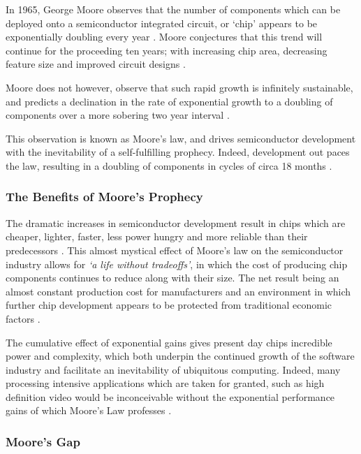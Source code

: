 \documentclass[12pt,a4paper]{article}
\begin{document}
In 1965, George Moore observes that the number of components which can be deployed onto a semiconductor integrated circuit, or `chip' appears to be exponentially doubling every year \cite{fiftyYearsOfMoores}. Moore conjectures that this trend will continue for the proceeding ten years; with increasing chip area, decreasing feature size and improved circuit designs \cite{endOfSemiconductors}.

Moore does not however, observe that such rapid growth is infinitely sustainable, and predicts a declination in the rate of exponential growth to a doubling of components over a more sobering two year interval \cite{fiftyYearsOfMoores}.

This observation is known as Moore's law, and drives semiconductor development with the inevitability of a self-fulfilling prophecy. Indeed, development out paces the law, resulting in a doubling of components in cycles of circa 18 months \cite{fiftyYearsOfMoores}.

\subsubsection{The Benefits of Moore's Prophecy} 

The dramatic increases in semiconductor development result in chips which are cheaper, lighter, faster, less power hungry and more reliable than their predecessors \cite{fiftyYearsOfMoores}. This almost mystical effect of Moore's law on the semiconductor industry allows for \cite{fiftyYearsOfMoores}  \textit{`a life without tradeoffs'}, in which the cost of producing chip components continues to reduce along with their size. The net result being an almost constant production cost for manufacturers and an environment in which further chip development appears to be protected from traditional economic factors \cite{fiftyYearsOfMoores}.

The cumulative effect of exponential gains gives present day chips incredible power and complexity, which both underpin the continued growth of the software industry and facilitate an inevitability of ubiquitous computing. Indeed, many processing intensive applications which are taken for granted, such as high definition video would be inconceivable without the exponential performance gains of which Moore's Law professes \cite{theKillRule}.

\subsubsection{Moore's Gap}
\end{document}
